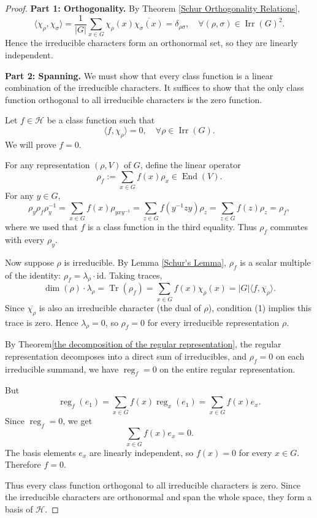 \begin{proof}

\medskip
\noindent\textbf{Part 1: Orthogonality.}  
By Theorem \ref{Schur Orthogonality Relations},
\[
\langle \chi_\rho, \chi_\sigma \rangle
= \frac{1}{|G|} \sum_{x \in G} \chi_\rho(x) \overline{\chi_\sigma(x)}
= \delta_{\rho\sigma},\quad \forall(\rho,\sigma)\in\operatorname{Irr}(G)^2.
\]
Hence the irreducible characters form an orthonormal set, so they are linearly independent.

\medskip
\noindent\textbf{Part 2: Spanning.}  
We must show that every class function is a linear combination of the irreducible characters. It suffices to show that the only class function orthogonal to all irreducible characters is the zero function.

Let \(f \in \mathcal H\) be a class function such that
\[
\langle f, \chi_\rho \rangle = 0, \quad \forall \rho \in \operatorname{Irr}(G). \tag{1}
\]
We will prove \(f = 0\).

For any representation \((\rho, V)\) of \(G\), define the linear operator
\[
\rho_f := \sum_{x \in G} f(x) \rho_x \in \operatorname{End}(V).
\]
For any \(y \in G\),
\[
\rho_y \rho_f \rho_y^{-1}
= \sum_{x \in G} f(x) \rho_{y x y^{-1}}
= \sum_{z \in G} f(y^{-1} z y) \rho_z
= \sum_{z \in G} f(z) \rho_z
= \rho_f,
\]
where we used that \(f\) is a class function in the third equality. Thus \(\rho_f\) commutes with every \(\rho_y\).

Now suppose \(\rho\) is irreducible. By Lemma \ref{Schur's Lemma}, \(\rho_f\) is a scalar multiple of the identity: \(\rho_f = \lambda_\rho \cdot \mathrm{id}\). Taking traces,
\[
\dim(\rho) \cdot \lambda_\rho
= \operatorname{Tr}(\rho_f)
= \sum_{x \in G} f(x) \chi_\rho(x)
= |G| \langle f, \overline{\chi_\rho} \rangle.
\]
Since \(\overline{\chi_\rho}\) is also an irreducible character (the dual of \(\rho\)), condition (1) implies this trace is zero. Hence \(\lambda_\rho = 0\), so \(\rho_f = 0\) for every irreducible representation \(\rho\).

By Theorem\ref{the decomposition of the regular representation}, the regular representation decomposes into a direct sum of irreducibles, and \(\rho_f = 0\) on each irreducible summand, we have \(\operatorname{reg}_f = 0\) on the entire regular representation.

But
\[
\operatorname{reg}_f(e_1) = \sum_{x \in G} f(x) \operatorname{reg}_x(e_1) = \sum_{x \in G} f(x) e_x.
\]
Since \(\operatorname{reg}_f = 0\), we get
\[
\sum_{x \in G} f(x) e_x = 0.
\]
The basis elements \(e_x\) are linearly independent, so \(f(x) = 0\) for every \(x \in G\). Therefore \(f = 0\).

Thus every class function orthogonal to all irreducible characters is zero. Since the irreducible characters are orthonormal and span the whole space, they form a basis of \(\mathcal H\).
\end{proof}

